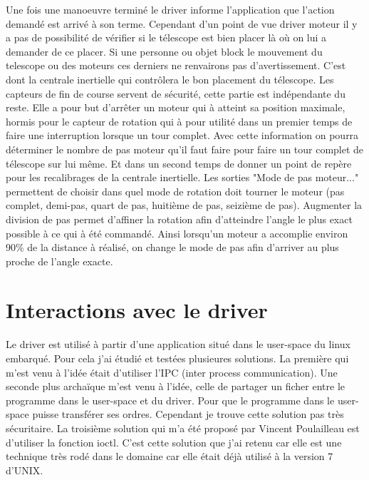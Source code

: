 Une fois une manoeuvre terminé le driver informe l'application que l'action demandé est arrivé à son terme. Cependant d'un point de vue driver moteur il y a pas de possibilité de vérifier si le télescope est bien placer là où on lui a demander de ce placer. Si une personne ou objet block le mouvement du telescope ou des moteurs ces derniers ne renvairons pas d'avertissement. C'est dont la centrale inertielle qui contrôlera le bon placement du télescope. \newline
Les capteurs de fin de course servent de sécurité, cette partie est indépendante du reste. Elle a pour but d'arrêter un moteur qui à atteint sa position maximale, hormis pour le capteur de rotation qui à pour utilité dans un premier temps de faire une interruption lorsque un tour complet. \newline Avec cette information on pourra déterminer le nombre de pas moteur qu'il faut faire pour faire un tour complet de télescope sur lui même. Et dans un second temps de donner un point de repère pour les recalibrages de la centrale inertielle. \newline 
Les sorties "Mode de pas moteur..." permettent de choisir dans quel mode de rotation doit tourner le moteur (pas complet, demi-pas, quart de pas, huitième de pas, seizième de pas). Augmenter la division de pas permet d’affiner la rotation afin d’atteindre l’angle le plus exact possible à ce qui à été commandé. Ainsi lorsqu'un moteur a accomplie environ 90\% de la distance à réalisé, on change le mode de pas afin d'arriver au plus proche de l'angle exacte.   



\section{Interactions avec le driver}

Le driver est utilisé à partir d'une application situé dans le user-space du linux embarqué. Pour cela j'ai étudié et testées plusieures solutions. \newline
La première qui m'est venu à l'idée était d'utiliser l'IPC (inter process communication). \newline
Une seconde plus archaïque m'est venu à l'idée, celle de partager un ficher entre le programme dans le user-space et du driver. Pour que le programme dans le user-space puisse transférer ses ordres. Cependant je trouve cette solution pas très sécuritaire. \newline
La troisième solution qui m'a été proposé par Vincent Poulailleau est d'utiliser la fonction ioctl. C'est cette solution que j'ai retenu car elle est une technique très rodé dans le domaine car elle était déjà utilisé à la version 7 d'UNIX. 
\vspace{1cm}

